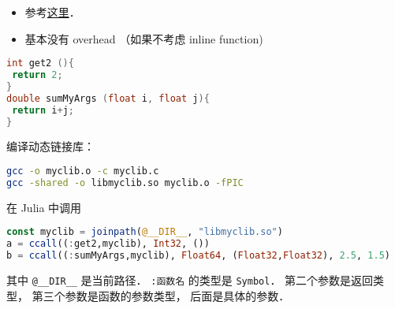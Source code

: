 
\begin{issues}
\issueDraft
\end{issues}

\begin{itemize}
\item 参考\href{https://docs.julialang.org/en/v1/manual/calling-c-and-fortran-code/}{这里}．
\item 基本没有 overhead （如果不考虑 inline function)
\end{itemize}

\begin{lstlisting}[language=cpp]
int get2 (){
 return 2;
}
double sumMyArgs (float i, float j){
 return i+j;
}
\end{lstlisting}

编译动态链接库：
\begin{lstlisting}[language=bash]
gcc -o myclib.o -c myclib.c
gcc -shared -o libmyclib.so myclib.o -fPIC
\end{lstlisting}

在 Julia 中调用
\begin{lstlisting}[language=julia]
const myclib = joinpath(@__DIR__, "libmyclib.so")
a = ccall((:get2,myclib), Int32, ())
b = ccall((:sumMyArgs,myclib), Float64, (Float32,Float32), 2.5, 1.5)
\end{lstlisting}
其中 \verb|@__DIR__| 是当前路径． \verb|:函数名| 的类型是 \verb|Symbol|． 第二个参数是返回类型， 第三个参数是函数的参数类型， 后面是具体的参数．
